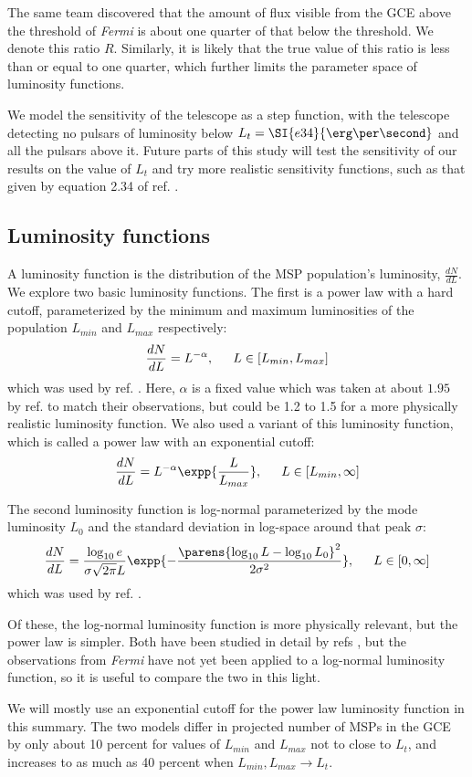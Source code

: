 \documentclass{C://Aliases//Dropbox-MIT//Latex_Templates//personal}
\begin{document}
The same team discovered that the amount of flux visible from the GCE above the threshold of \textit{Fermi} is about one quarter of that below the threshold. We denote this ratio $R$. Similarly, it is likely that the true value of this ratio is less than or equal to one quarter, which further limits the parameter space of luminosity functions.

We model the sensitivity of the telescope as a step function, with the telescope detecting no pulsars of luminosity below $L_{t} = \SI{e34}{\erg\per\second}$ and all the pulsars above it. Future parts of this study will test the sensitivity of our results on the value of $L_t$ and try more realistic sensitivity functions, such as that given by equation 2.34 of ref. \cite{ploeg}.


\subsection{Luminosity functions}
A luminosity function is the distribution of the MSP population's luminosity, $\frac{dN}{dL}$. We explore two basic luminosity functions. The first is a power law with a hard cutoff, parameterized by the minimum and maximum luminosities of the population $L_{min}$ and $L_{max}$ respectively: 
$$\frac{dN}{dL} = L^{-\alpha}, \indent L\in [L_{min}, L_{max}]$$
which was used by ref. \cite{fermilab}. Here, $\alpha$ is a fixed value which was taken at about $1.95$ by ref. \cite{fermilab} to match their observations, but could be 1.2 to 1.5 for a more physically realistic luminosity function. We also used a variant of this luminosity function, which is called a power law with an exponential cutoff:
$$\frac{dN}{dL} = L^{-\alpha}\expp{\frac{L}{L_{max}}}, \indent L\in [L_{min}, \infty]$$

The second luminosity function is log-normal parameterized by the mode luminosity $L_0$ and the standard deviation in log-space around that peak $\sigma$: 
$$\frac{dN}{dL} = \frac{\log_{10}e}{\sigma \sqrt{2\pi} L}\expp{-\frac{\parens{\log_{10} L - \log_{10}L_0}^2}{2\sigma^2}}, \indent L\in [0, \infty]$$
which was used by ref. \cite{log-normal}.

Of these, the log-normal luminosity function is more physically relevant, but the power law is simpler. Both have been studied in detail by refs \cite{fermilab, log-normal}, but the observations from \textit{Fermi} have not yet been applied to a log-normal luminosity function, so it is useful to compare the two in this light.

We will mostly use an exponential cutoff for the power law luminosity function in this summary. The two models differ in projected number of MSPs in the GCE by only about 10 percent for values of $L_{min}$ and $L_{max}$ not to close to $L_t$, and increases to as much as 40 percent when $L_{min}, L_{max} \rightarrow L_t$.
\end{document}
